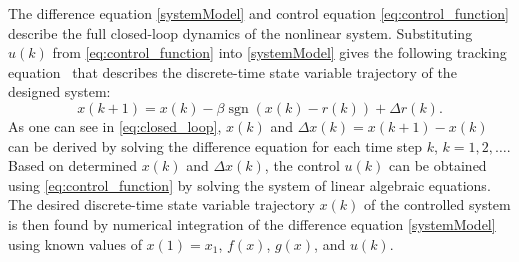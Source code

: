 The difference equation \eqref{systemModel} and control equation
\eqref{eq:control_function} describe the full closed-loop dynamics of the
nonlinear system. Substituting $u(k)$ from \eqref{eq:control_function} into
\eqref{systemModel} gives the following tracking
equation~\cite{tymoshchuk2024tracking} that describes the discrete-time state
variable trajectory of the designed system:
\begin{equation}
	\label{eq:closed_loop}
	x(k+1) = x(k) - \beta \operatorname{sgn}(x(k) - r(k)) + \Delta r(k).
\end{equation}
As one can see in \eqref{eq:closed_loop}, $x(k)$ and
$\Delta x(k) = x(k+1) - x(k)$ can be derived by solving the difference
equation for each time step $k$, $k = 1, 2, \ldots$. Based on determined
$x(k)$ and $\Delta x(k)$, the control $u(k)$ can be obtained using
\eqref{eq:control_function} by solving the system of linear algebraic
equations. The desired discrete-time state variable trajectory $x(k)$ of the
controlled system is then found by numerical integration of the difference
equation \eqref{systemModel} using known values of $x(1) = x_1$, $f(x)$,
$g(x)$, and $u(k)$.
